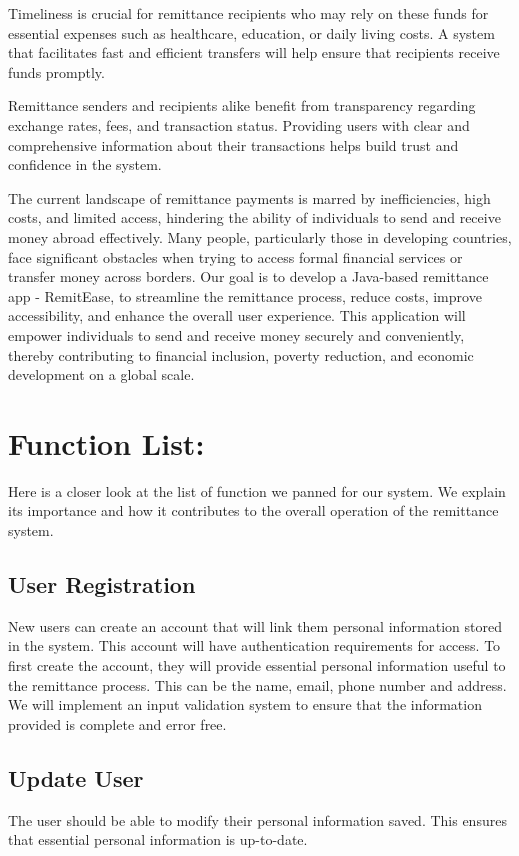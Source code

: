 \documentclass[onecolumn, letterpaper, ]{report}
\begin{document}
        Timeliness is crucial for remittance recipients who may rely on these funds for essential expenses such as healthcare, education, or daily living costs. A system that facilitates fast and efficient transfers will help ensure that recipients receive funds promptly.
        
        Remittance senders and recipients alike benefit from transparency regarding exchange rates, fees, and transaction status. Providing users with clear and comprehensive information about their transactions helps build trust and confidence in the system.
        
        The current landscape of remittance payments is marred by inefficiencies, high costs, and limited access, hindering the ability of individuals to send and receive money abroad effectively. Many people, particularly those in developing countries, face significant obstacles when trying to access formal financial services or transfer money across borders. Our goal is to develop a Java-based remittance app - RemitEase, to streamline the remittance process, reduce costs, improve accessibility, and enhance the overall user experience. This application will empower individuals to send and receive money securely and conveniently, thereby contributing to financial inclusion, poverty reduction, and economic development on a global scale.

        

    \section{\colorbox{white!95!black}{Function List:} } 
    Here is a closer look at the list of function we panned for our system. We explain its importance and how it contributes to the overall operation of the remittance system.

        \subsection{User Registration}
            New users can create an account that will link them personal information stored in the system. This account will have authentication requirements for access. To first create the account, they will provide essential personal information useful to the remittance process. This can be the name, email, phone number and address. We will implement an input validation system to ensure that the information provided is complete and error free. 
    
        \subsection{Update User} The user should be able to modify their personal information saved. This ensures that essential personal information is up-to-date. 
\end{document}
